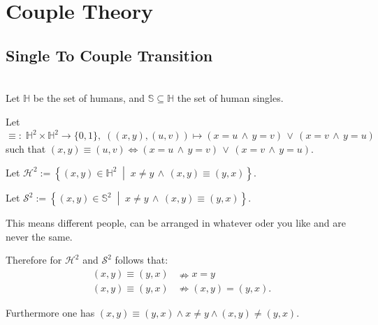 \section{Couple Theory}
\label{sec:en:theory}

\subsection{Single To Couple Transition}

\begin{definition}\label{sec:en:definition:human-sets}
    \leavevmode\\
    Let $\mathbb{H}$ be the set of humans, and $\mathbb{S}\subseteq\mathbb{H}$ the set of human singles.
   
    Let $\equiv:\;\mathbb{H}^2\times\mathbb{H}^2\rightarrow\{0,1\},\;((x,y),(u,v))\mapsto (x=u\,\land\,y=v)\,\lor\,(x=v\,\land\,y=u)$ such that
    $(x,y)\equiv(u,v)\Longleftrightarrow(x=u\,\land\,y=v)\,\lor\,(x=v\,\land\,y=u)$.
    
    Let $\mathcal{H}^2:=\left\{ (x,y)\in\mathbb{H}^2 \;\middle|\; x\neq y \,\land\, (x,y)\equiv(y,x) \right\}$.
    
    Let $\mathcal{S}^2:=\left\{ (x,y)\in\mathbb{S}^2 \;\middle|\; x\neq y \,\land\, (x,y)\equiv(y,x) \right\}$.
    
    This means different people, can be arranged in whatever oder you like and are never the same.
    
    Therefore for $\mathcal{H}^2$ and $\mathcal{S}^2$ follows that:
    \begin{align*}
        (x,y)\equiv(y,x) &\nRightarrow x = y \\
        (x,y)\equiv(y,x) &\nRightarrow(x,y)=(y,x).
    \end{align*}

    Furthermore one has $(x,y)\equiv(y,x)\land x\neq y\land (x,y)\neq(y,x)$.
\end{definition}

